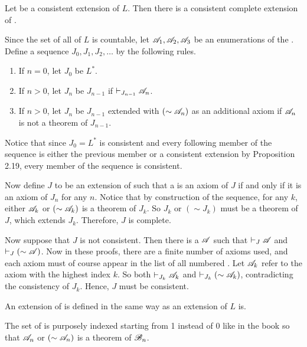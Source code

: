 \begin{proposition}
  Let \Lext{} be a consistent extension of \(L\). Then there is a consistent complete extension of \Lext{}.

  \proof{} Since the set of all \wfs{} of \(L\) is countable, let \(\mathscr{A}_1, \mathscr{A}_2, \mathscr{A}_3\) be an enumerations of the \wfs{}. Define a sequence \(J_0, J_1, J_2, \dots\) by the following rules.

  \begin{enumerate}
    \item If \(n = 0\), let \(J_0\) be \(L^{\ast}\).

    \item If \(n > 0\), let \(J_n\) be \(J_{n - 1}\) if \(\vdash_{J_{n - 1}} \mathscr{A}_n\).

    \item If \(n > 0\), let \(J_n\) be \(J_{n - 1}\) extended with \((\sim\mathscr{A}_n)\) as an additional axiom if \(\mathscr{A}_n\) is not a theorem of \(J_{n - 1}\).
  \end{enumerate}

  Notice that since \(J_0 = L^{\ast}\) is consistent and every following member of the sequence is either the previous member or a consistent extension by Proposition 2.19, every member of the sequence is consistent.

  Now define \(J\) to be an extension of \Lext{} such that a \wf{} is an axiom of \(J\) if and only if it is an axiom of \(J_n\) for any \(n\). Notice that by construction of the sequence, for any \(k\), either \(\mathscr{A}_k\) or \((\sim\mathscr{A}_k)\) is a theorem of \(J_k\). So \(J_k\) or \((\sim J_k)\) must be a theorem of \(J\), which extends \(J_k\). Therefore, \(J\) is complete.

  Now suppose that \(J\) is not consistent. Then there is a \wf{} \(\mathscr{A}\) such that \(\vdash_{J} \mathscr{A}\) and \(\vdash_{J} (\sim\mathscr{A})\). Now in these proofs, there are a finite number of axioms used, and each axiom must of course appear in the list of all numbered \wfs{}. Let \(\mathscr{A}_k\) refer to the axiom with the highest index \(k\). So both \(\vdash_{J_k} \mathscr{A}_k\) and \(\vdash_{J_k} (\sim\mathscr{A}_k)\), contradicting the consistency of \(J_k\). Hence, \(J\) must be consistent.

  \note{} An extension of \Lext{} is defined in the same way as an extension of \(L\) is.

  \note{} The set of \wfs{} is purposely indexed starting from 1 instead of 0 like in the book so that \(\mathscr{A}_n\) or \((\sim\mathscr{A}_n)\) is a theorem of \(\mathscr{B}_n\).
\end{proposition}

